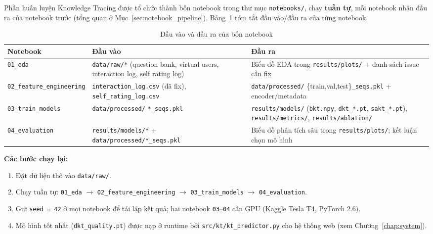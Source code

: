 Phần huấn luyện Knowledge Tracing được tổ chức thành bốn notebook trong thư mục \texttt{notebooks/}, chạy \textbf{tuần tự}, mỗi notebook nhận đầu ra của notebook trước (tổng quan ở Mục~\ref{sec:notebook_pipeline}). Bảng~\ref{tab:notebook_io} tóm tắt đầu vào/đầu ra của từng notebook.

\begin{table}[H]
  \centering
  \caption{Đầu vào và đầu ra của bốn notebook}
  \label{tab:notebook_io}
  \begin{tabular}{p{2.5cm}p{4.2cm}p{4.6cm}}
    \toprule
    \textbf{Notebook} & \textbf{Đầu vào} & \textbf{Đầu ra} \\
    \midrule
    \texttt{01\_eda} &
    \texttt{data/raw/*} (question bank, virtual users, interaction log, self rating log) &
    Biểu đồ EDA trong \texttt{results/plots/} + danh sách issue cần fix \\
    \addlinespace
    \texttt{02\_feature\_engineering} &
    \texttt{interaction\_log.csv} (đã fix), \texttt{self\_rating\_log.csv} &
    \texttt{data/processed/} \{train,val,test\}\texttt{\_seqs.pkl} + encoder/metadata \\
    \addlinespace
    \texttt{03\_train\_models} &
    \texttt{data/processed/} \texttt{*\_seqs.pkl} &
    \texttt{results/models/} (\texttt{bkt.npy}, \texttt{dkt\_*.pt}, \texttt{sakt\_*.pt}), \texttt{results/metrics/}, \texttt{results/ablation/} \\
    \addlinespace
    \texttt{04\_evaluation} &
    \texttt{results/models/*} + \texttt{data/processed/*\_seqs.pkl} &
    Biểu đồ phân tích sâu trong \texttt{results/plots/}; kết luận chọn mô hình \\
    \bottomrule
  \end{tabular}
\end{table}

\noindent\textbf{Các bước chạy lại:}
\begin{enumerate}
  \item Đặt dữ liệu thô vào \texttt{data/raw/}.
  \item Chạy tuần tự: \texttt{01\_eda} $\to$ \texttt{02\_feature\_engineering} $\to$ \texttt{03\_train\_models} $\to$ \texttt{04\_evaluation}.
  \item Giữ \texttt{seed = 42} ở mọi notebook để tái lập kết quả; hai notebook \texttt{03}--\texttt{04} cần GPU (Kaggle Tesla T4, PyTorch 2.6).
  \item Mô hình tốt nhất (\texttt{dkt\_quality.pt}) được nạp ở runtime bởi \texttt{src/kt/kt\_predictor.py} cho hệ thống web (xem Chương~\ref{chap:system}).
\end{enumerate}

